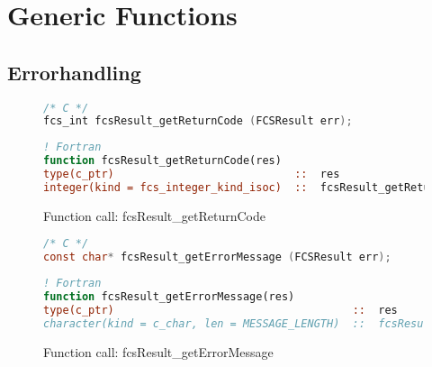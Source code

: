 \section{Generic Functions}

\FloatBarrier
\subsection{Errorhandling}

\begin{figure}[htb]
\begin{lstlisting}[language=C,frame=trBL,breaklines,basicstyle=\ttfamily,prebreak={\raisebox{0ex}[0ex][0ex]{\ensuremath{\hookleftarrow}}}]
/* C */
fcs_int fcsResult_getReturnCode (FCSResult err);
\end{lstlisting}
\begin{lstlisting}[language=Fortran,frame=trBL,breaklines,basicstyle=\ttfamily,prebreak={\raisebox{0ex}[0ex][0ex]{\ensuremath{\hookleftarrow}}}]
! Fortran
function fcsResult_getReturnCode(res)
type(c_ptr)                            ::  res
integer(kind = fcs_integer_kind_isoc)  ::  fcsResult_getReturnCode
\end{lstlisting}
\caption{Function call: fcsResult\_getReturnCode}
\label{fig:fcsResult_getReturnCode}
\end{figure}

\begin{figure}[htb]
\begin{lstlisting}[language=C,frame=trBL,breaklines,basicstyle=\ttfamily,prebreak={\raisebox{0ex}[0ex][0ex]{\ensuremath{\hookleftarrow}}}]
/* C */
const char* fcsResult_getErrorMessage (FCSResult err);
\end{lstlisting}
\begin{lstlisting}[language=Fortran,frame=trBL,breaklines,basicstyle=\ttfamily,prebreak={\raisebox{0ex}[0ex][0ex]{\ensuremath{\hookleftarrow}}}]
! Fortran
function fcsResult_getErrorMessage(res)
type(c_ptr)                                     ::  res
character(kind = c_char, len = MESSAGE_LENGTH)  ::  fcsResult_getErrorMessage
\end{lstlisting}
\caption{Function call: fcsResult\_getErrorMessage}
\label{fig:fcsResult_getErrorMessage}
\end{figure}

